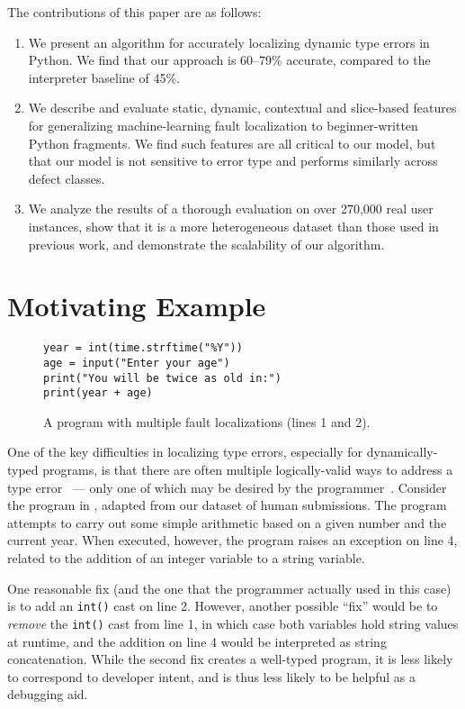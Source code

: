 \documentclass[conference]{IEEEtran}
\newcommand\lt[1]{{\lstinline|#1|}}
\begin{document}
The contributions of this paper are as follows:
\begin{enumerate}

\item We present an algorithm for accurately localizing dynamic type errors
in Python. We find that our approach is 60--79\% accurate, compared to
the interpreter baseline of 45\%.  

\item We describe and evaluate static, dynamic, contextual and slice-based
features for generalizing machine-learning fault localization to
beginner-written Python fragments. We find such features are all critical
to our model, but that our model is not sensitive to error type and
performs similarly across defect classes.  

\item We analyze the results of a thorough evaluation on over 270,000 real
user instances, show that it is a more heterogeneous dataset than those used
in previous work, and demonstrate the scalability of our algorithm.

\end{enumerate}

\section{Motivating Example}
\label{sec-motex}

\begin{figure}
\begin{lstlisting}
year = int(time.strftime("%Y"))
age = input("Enter your age")
print("You will be twice as old in:")
print(year + age)
\end{lstlisting}
\caption{
\label{fig-motex}
A program with multiple fault localizations (lines 1 and 2).}
\end{figure}

One of the key difficulties in localizing type errors, especially for
dynamically-typed programs, is that there are often multiple
logically-valid ways to address a type error~\cite{FIXME} --- only one of
which may be desired by the programmer~\cite{FIXME}.  Consider the program
in , adapted from our dataset of human submissions. The
program attempts to carry out some simple arithmetic based on a given
number and the current year. When executed, however, the program raises an
exception on line 4, related to the addition of an integer variable to a
string variable.

One reasonable fix (and the one that the programmer actually used in this
case) is to add an \lt{int()} cast on line 2. However, another possible
``fix'' would be to \textit{remove} the \lt{int()} cast from line 1, in
which case both variables hold string values at runtime, and the addition
on line 4 would be interpreted as string concatenation. While the second
fix creates a well-typed program, it is less likely to correspond to
developer intent, and is thus less likely to be helpful as a debugging aid.
\end{document}
